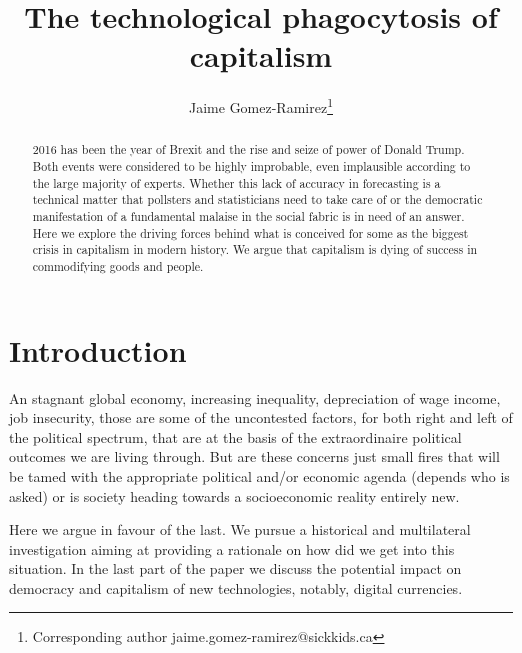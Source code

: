 \documentclass[11pt, onecolumn]{article}
\begin{document}
\title{The technological phagocytosis of capitalism}

\author[1]{Jaime Gomez-Ramirez\thanks{Corresponding author \hspace{0.6cm} jaime.gomez-ramirez@sickkids.ca}}
\affil[1]{}
\date{}
\maketitle

\begin{abstract}

2016 has been the year of Brexit and the rise and seize of power of Donald Trump. Both events were considered to be highly improbable, even implausible  according to the large majority of experts.
Whether this lack of accuracy in forecasting is a technical matter that  pollsters and statisticians need to take care of or the democratic manifestation of a fundamental malaise in the social fabric is in need of an answer.
Here we explore the driving forces behind what is conceived for some as the biggest crisis in capitalism in modern history. We argue that capitalism is dying of success in commodifying goods and people. 

\end{abstract}

\section{Introduction}
\label{se:intro}

An stagnant global economy, increasing inequality, depreciation of wage income, job insecurity, those are some of the uncontested factors, for both right and left of the political spectrum, that are at the basis of the extraordinaire political outcomes we are living through.
But are these concerns just small fires that will be tamed with the appropriate political and/or economic agenda (depends who is asked) or is society heading towards a  socioeconomic reality entirely new.

Here we argue in favour of the last. We pursue a historical and multilateral investigation aiming at providing a rationale on how did we get into this situation. In the last part of the paper we discuss the potential impact on democracy and capitalism of new technologies, notably, digital currencies. 
\end{document}

